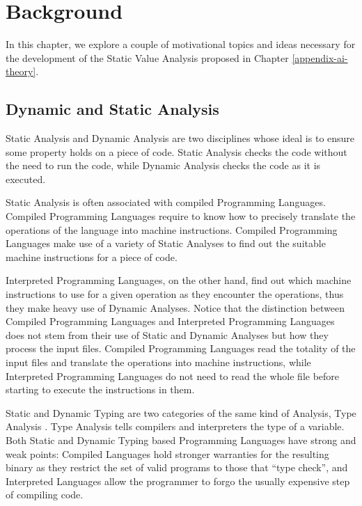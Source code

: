 \chapter{Background}\label{background}

In this chapter, we explore a couple of motivational topics and ideas
necessary for the development of the Static Value Analysis proposed in
Chapter \ref{appendix-ai-theory}.

\section{Dynamic and Static Analysis}%
\label{dynamic-and-static-analysis}

Static Analysis and Dynamic Analysis are two disciplines whose ideal is to ensure some
property
holds on a piece of code. Static Analysis checks the code without the
need to run the code, while Dynamic Analysis checks the code as it is
executed.

Static Analysis is often associated with compiled Programming Languages.
Compiled Programming Languages require to know how to precisely
translate the operations of the language into machine instructions.
Compiled Programming Languages make use of a variety of Static Analyses
to find out the suitable machine instructions for a piece of code.

Interpreted Programming Languages, on the other hand, find out which
machine instructions to use for a given operation as they encounter the
operations, thus they make heavy use of Dynamic Analyses. Notice that
the distinction between Compiled Programming Languages and Interpreted
Programming Languages does not stem from their use of Static and Dynamic
Analyses but how they process the input files. Compiled Programming
Languages read the totality of the input files and translate the
operations into machine instructions, while Interpreted Programming
Languages do not need to read the whole file before starting to execute
the instructions in them.

Static and Dynamic Typing are two categories of the same kind of
Analysis, Type Analysis \autocite{pierce_types_2002}. Type Analysis
tells compilers and interpreters the type of a variable. Both Static and
Dynamic Typing based Programming Languages have strong and weak points:
Compiled Languages hold stronger warranties for the resulting binary as
they restrict the set of valid programs to those that \enquote{type
check}, and Interpreted Languages allow the programmer to forgo the
usually expensive step of compiling code.

